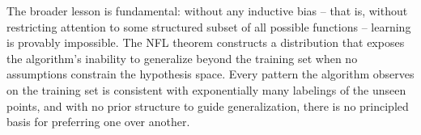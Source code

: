 % 
%
The broader lesson is fundamental: without any inductive bias -- that is, without restricting attention to some structured subset of all possible functions -- learning is provably impossible. The NFL theorem constructs a distribution that exposes the algorithm's inability to generalize beyond the training set when no assumptions constrain the hypothesis space. Every pattern the algorithm observes on the training set is consistent with exponentially many labelings of the unseen points, and with no prior structure to guide generalization, there is no principled basis for preferring one over another.

